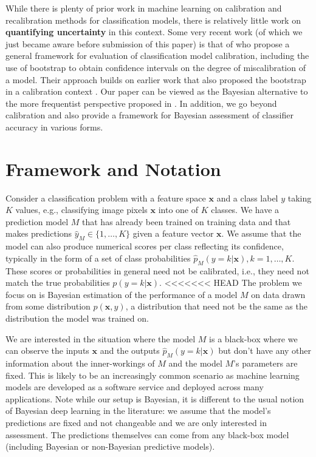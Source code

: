 \documentclass{article}
\newcommand{\ux}{{\mathbf{x}}}
\begin{document}
While there is plenty of prior work in machine learning on calibration and recalibration methods for classification models, there is relatively little work on {\bf quantifying uncertainty} in this context.
Some very recent work (of which we just became aware before submission of this paper) is that of \citet{vaicenavicius19a} who propose a general framework for evaluation of classification model calibration, including the use of bootstrap to obtain confidence intervals on the degree of miscalibration of a model. Their approach builds on earlier work that also proposed the bootstrap in a calibration context \cite{brocker2007increasing}. Our paper can be viewed as the Bayesian alternative to the more frequentist perspective proposed in \citet{vaicenavicius19a}.
In addition, we go beyond calibration and also provide a framework for Bayesian assessment of classifier accuracy in various forms.


\section{Framework and Notation}

Consider a classification problem with a feature space $\ux$ and a class label $y$ taking $K$ values, e.g., classifying image pixels $\ux$ into one of $K$ classes.
We have a prediction model $M$ that has already been trained on training data and that makes predictions $\hat{y}_M \in \{1, \ldots, K\}$ given a feature vector $\ux$.
We assume that the model can also produce numerical scores per class reflecting its confidence, typically in the form of a set of class probabilities $\hat{p}_M(y = k | \ux), k = 1,\ldots,K$.
These scores or probabilities in general need not be calibrated, i.e., they need not match the true probabilities $p(y=k | \ux)$.
<<<<<<< HEAD
The problem we focus on is Bayesian estimation of the performance of a model $M$ on data drawn from some distribution $p(\ux,y)$, a distribution that need not be the same as the distribution the model was trained on.

We are interested in the situation where the model $M$ is a black-box where we can observe the inputs $\ux$ and the outputs $\hat{p}_M(y = k | \ux)$ but don't have any other information about the inner-workings of $M$ and the model $M$'s parameters are fixed.
This is likely to be an increasingly common scenario as machine learning models are developed as a software service and deployed across many applications.
Note while our setup is Bayesian, it is different to the usual notion of Bayesian deep learning in the literature: we assume that the model's predictions are fixed and not changeable and we are only interested in assessment.
The predictions themselves can come from any black-box model (including Bayesian or non-Bayesian predictive models).
\end{document}
